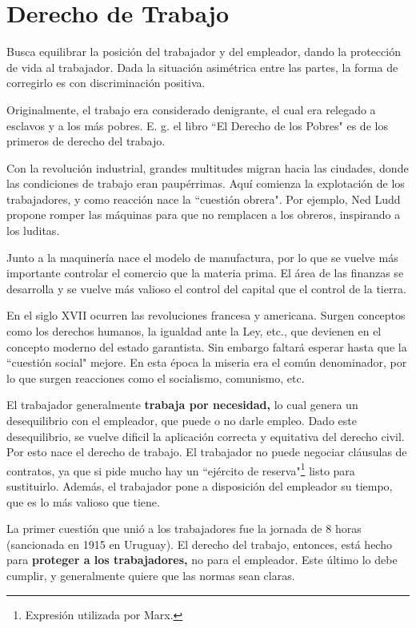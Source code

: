 \documentclass[../main.tex]{subfiles}
\begin{document}
\chapter{Derecho de Trabajo}

Busca equilibrar la posición del trabajador y del empleador, dando la protección de vida al trabajador.
Dada la situación asimétrica entre las partes, la forma de corregirlo es con discriminación positiva.

Originalmente, el trabajo era considerado denigrante, el cual era relegado a esclavos y a los más pobres.
E. g. el libro ``El Derecho de los Pobres" es de los primeros de derecho del trabajo.

Con la revolución industrial, grandes multitudes migran hacia las ciudades, donde las condiciones de trabajo eran paupérrimas.
Aquí comienza la explotación de los trabajadores, y como reacción nace la ``cuestión obrera".
Por ejemplo, Ned Ludd propone romper las máquinas para que no remplacen a los obreros, inspirando a los luditas.

Junto a la maquinería nace el modelo de manufactura, por lo que se vuelve más importante controlar el comercio que la materia prima.
El área de las finanzas se desarrolla y se vuelve más valioso el control del capital que el control de la tierra.

En el siglo XVII ocurren las revoluciones francesa y americana.
Surgen conceptos como los derechos humanos, la igualdad ante la Ley, etc., que devienen en el concepto moderno del estado garantista.
Sin embargo faltará esperar hasta que la ``cuestión social" mejore.
En esta época la miseria era el común denominador, por lo que surgen reacciones como el socialismo, comunismo, etc.

El trabajador generalmente \textbf{trabaja por necesidad,} lo cual genera un desequilibrio con el empleador, que puede o no darle empleo.
Dado este desequilibrio, se vuelve dificil la aplicación correcta y equitativa del derecho civil.
Por esto nace el derecho de trabajo.
El trabajador no puede negociar cláusulas de contratos, ya que si pide mucho hay un ``ejército de reserva"\footnote{Expresión utilizada por Marx.} listo para sustituirlo.
Además, el trabajador pone a disposición del empleador su tiempo, que es lo más valioso que tiene.

La primer cuestión que unió a los trabajadores fue la jornada de 8 horas (sancionada en 1915 en Uruguay).
El derecho del trabajo, entonces, está hecho para \textbf{proteger a los trabajadores,} no para el empleador.
Este último lo debe cumplir, y generalmente quiere que las normas sean claras.
\end{document}
